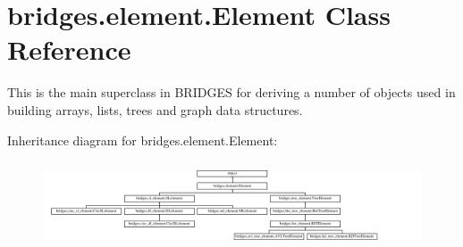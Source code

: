 \hypertarget{classbridges_1_1element_1_1_element}{}\section{bridges.\+element.\+Element Class Reference}
\label{classbridges_1_1element_1_1_element}


This is the main superclass in B\+R\+I\+D\+G\+E\+S for deriving a number of objects used in building arrays, lists, trees and graph data structures.  


Inheritance diagram for bridges.\+element.\+Element\+:\begin{figure}[H]
\begin{center}
\leavevmode
\includegraphics[height=2.574713cm]{classbridges_1_1element_1_1_element}
\end{center}
\end{figure}
